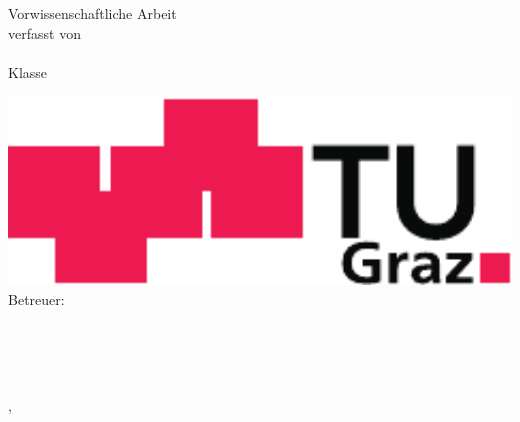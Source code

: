 

\thispagestyle{empty}  %
\large  %

\begin{center}

\mbox{\LARGE\bfseries\mytitle}

\vfill

Vorwissenschaftliche Arbeit\\[3mm]
verfasst von\\[3mm]
{\Large\bfseries\myauthor}\\[5mm]
Klasse \mystudy\\[40mm]

\vfill

\includegraphics[height=5cm]{figures/institution}\\[10mm]

Betreuer: \mysupervisor

\vfill

\myinstitute\\
\myhomestreet\\
\myhomepostalnumber~\myhometown

\vfill

\mysubmissiontown, \mysubmissionmonth~\mysubmissionyear
\end{center}
\normalsize %
\newpage

\newpage

